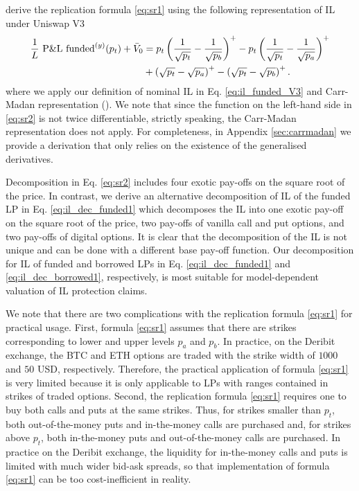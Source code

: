 \documentclass[pdftex,11pt,a4paper] {article}
\begin{document}
\cite{Deng2023} derive the replication formula \eqref{eq:sr1} using the
following representation of IL under Uniswap V3
\begin{equation}  \label{eq:sr2}
\begin{split}
\frac{1}{L} \ \mathrm{P\&L \ funded}^{(y)}(p_{t}) + \bar{V}_{0} & = p_{t}\left( \frac{1}{\sqrt{%
p_{t}}} - \frac{1}{\sqrt{p_{b}}} \right)^{+} - p_{t}\left( \frac{1}{\sqrt{%
p_{t}}} - \frac{1}{\sqrt{p_{a}}} \right)^{+} \\
& + \left( \sqrt{p_{t}} - \sqrt{p_{a}}\right)^{+} -\left( \sqrt{p_{t}} -
\sqrt{p_{b}}\right)^{+}.
\end{split}%
\end{equation}
where we apply our definition of nominal IL in Eq. \eqref{eq:il_funded_V3}
and Carr-Madan representation (\citet{Carr2001}). We note that since the
function on the left-hand side in \eqref{eq:sr2} is not twice
differentiable, strictly speaking, the Carr-Madan representation does not
apply. For completeness, in Appendix \ref{sec:carrmadan} we provide a
derivation that only relies on the existence of the generalised derivatives.

Decomposition in Eq. \eqref{eq:sr2} includes four exotic pay-offs on the
square root of the price. In contrast, we derive an alternative
decomposition of IL of the funded LP in Eq. \eqref{eq:il_dec_funded1} which
decomposes the IL into one exotic pay-off on the square root of the price,
two pay-offs of vanilla call and put options, and two pay-offs of digital
options. It is clear that the decomposition of the IL is not unique and can
be done with a different base pay-off function. Our decomposition for IL of
funded and borrowed LPs in Eq. \eqref{eq:il_dec_funded1} and %
\eqref{eq:il_dec_borrowed1}, respectively, is most suitable for
model-dependent valuation of IL protection claims.

We note that there are two complications with the replication formula %
\eqref{eq:sr1} for practical usage. First, formula \eqref{eq:sr1} assumes
that there are strikes corresponding to lower and upper levels $p_{a}$ and $%
p_{b}$. In practice, on the Deribit exchange, the BTC and ETH options are traded
with the strike width of $1000$ and $50$ USD, respectively. Therefore, the
practical application of formula \eqref{eq:sr1} is very limited because it
is only applicable to LPs with ranges contained in strikes of traded options.
Second, the replication formula \eqref{eq:sr1} requires one to buy both calls and
puts at the same strikes. Thus, for strikes smaller than $p_{t}$, both
out-of-the-money puts and in-the-money calls are purchased and, for strikes
above $p_{t}$, both in-the-money puts and out-of-the-money calls are purchased.
In practice on the Deribit exchange, the liquidity for in-the-money calls and
puts is limited with much wider bid-ask spreads, so that implementation of
formula \eqref{eq:sr1} can be too cost-inefficient in reality.
\end{document}
